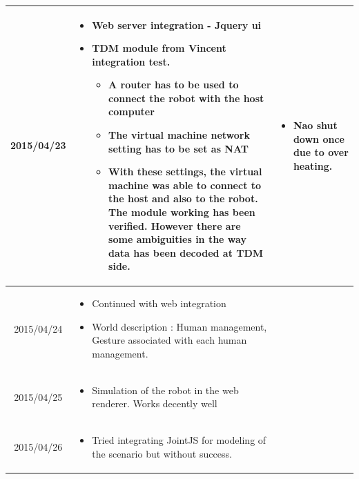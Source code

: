 \documentclass[11pt]{article} %
\begin{document}
\begin{center}
\begin{longtable}{ | c | p{6cm} | p{5cm} |}
  2015/04/23         & 
  \begin{itemize}
  \item Web server integration - Jquery ui
  \item TDM module from Vincent integration test. 
  \begin{itemize}
  	\item A router has to be used to connect the robot with the host computer
  	\item The virtual machine network setting has to be set as NAT
  	\item With these settings, the virtual machine was able to connect to the host and also to the robot. The module working has been verified. However there are some ambiguities in the way data has been decoded at TDM side.
  \end{itemize}
\end{itemize}   
  & 
  \begin{itemize}
  \item Nao shut down once due to over heating.
  \end{itemize}
\\  										 \hline

  2015/04/24         & 
  \begin{itemize}
  \item Continued with web integration
  \item World description : Human management, Gesture associated with each human management.
\end{itemize}   
  & 
\\
  										 \hline
  										 
	 2015/04/25         & 
  \begin{itemize}
  \item Simulation of the robot in the web renderer. Works decently well
  \end{itemize}
  & 
		\\					 \hline  	

	 2015/04/26         & 
  \begin{itemize}
  \item Tried integrating JointJS for modeling of the scenario but without success.
\end{itemize}   
  & 
		\\					 \hline  	
										 
  										   								 
    \end{longtable}
\end{center}
\end{document}
